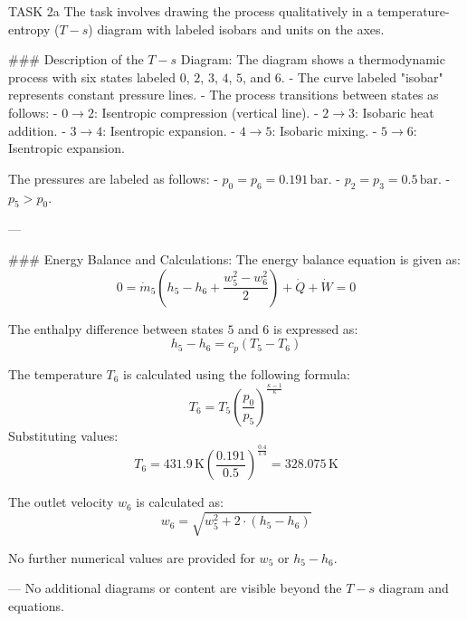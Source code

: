 TASK 2a  
The task involves drawing the process qualitatively in a temperature-entropy (\(T-s\)) diagram with labeled isobars and units on the axes.  

### Description of the \(T-s\) Diagram:  
The diagram shows a thermodynamic process with six states labeled \(0\), \(2\), \(3\), \(4\), \(5\), and \(6\).  
- The curve labeled "isobar" represents constant pressure lines.  
- The process transitions between states as follows:  
  - \(0 \to 2\): Isentropic compression (vertical line).  
  - \(2 \to 3\): Isobaric heat addition.  
  - \(3 \to 4\): Isentropic expansion.  
  - \(4 \to 5\): Isobaric mixing.  
  - \(5 \to 6\): Isentropic expansion.  

The pressures are labeled as follows:  
- \(p_0 = p_6 = 0.191 \, \text{bar}\).  
- \(p_2 = p_3 = 0.5 \, \text{bar}\).  
- \(p_5 > p_0\).  

---

### Energy Balance and Calculations:  
The energy balance equation is given as:  
\[
0 = \dot{m}_5 \left( h_5 - h_6 + \frac{w_5^2 - w_6^2}{2} \right) + \dot{Q} + \dot{W} = 0
\]  

The enthalpy difference between states \(5\) and \(6\) is expressed as:  
\[
h_5 - h_6 = c_p (T_5 - T_6)
\]  

The temperature \(T_6\) is calculated using the following formula:  
\[
T_6 = T_5 \left( \frac{p_0}{p_5} \right)^{\frac{\kappa - 1}{\kappa}}
\]  
Substituting values:  
\[
T_6 = 431.9 \, \text{K} \left( \frac{0.191}{0.5} \right)^{\frac{0.4}{1.4}} = 328.075 \, \text{K}
\]  

The outlet velocity \(w_6\) is calculated as:  
\[
w_6 = \sqrt{w_5^2 + 2 \cdot (h_5 - h_6)}
\]  

No further numerical values are provided for \(w_5\) or \(h_5 - h_6\).  

---  
No additional diagrams or content are visible beyond the \(T-s\) diagram and equations.